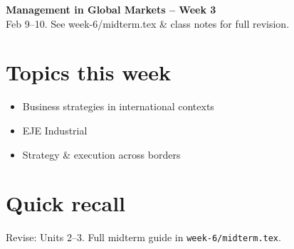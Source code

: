 \documentclass[10pt,a4paper]{article}
\begin{document}
\begin{center}
{\large\bfseries\color{eublue} Management in Global Markets -- Week 3}\\[0.2em]
\footnotesize Feb 9--10. See week-6/midterm.tex \& class notes for full revision.
\end{center}\vspace{0.5em}

\section*{\color{eublue}Topics this week}
\begin{itemize}
\item Business strategies in international contexts
\item EJE Industrial
\item Strategy \& execution across borders
\end{itemize}

\section*{Quick recall}
Revise: Units 2--3. Full midterm guide in \texttt{week-6/midterm.tex}.
\end{document}
